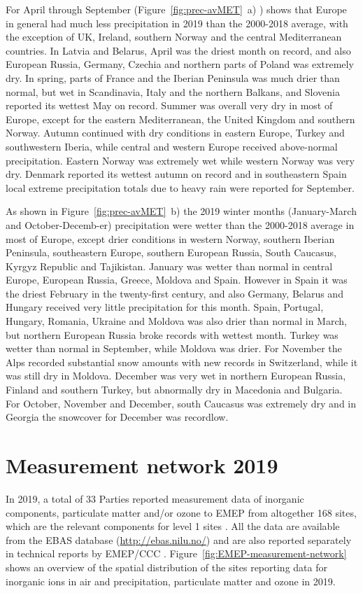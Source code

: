 For April through September (Figure~\ref{fig:prec-avMET}~a) ) shows that Europe in general had much less precipitation in 2019 than the 2000-2018 average, with the exception of UK, Ireland, southern Norway and the central Mediterranean countries. In Latvia and Belarus, April was the driest month on record, and also European Russia, Germany, Czechia and northern parts of Poland was extremely dry. In spring, parts of France and the Iberian Peninsula was much drier than normal, but wet in Scandinavia, Italy and the northern Balkans, and Slovenia reported its wettest May on record. Summer was overall very dry in most of Europe, except for the eastern Mediterranean, the United Kingdom and southern Norway. Autumn continued with dry conditions in eastern Europe, Turkey and southwestern Iberia, while central and western Europe received above-normal precipitation. Eastern Norway was extremely wet while western Norway was very dry. Denmark reported its wettest autumn on record and in southeastern Spain local extreme precipitation totals due to heavy rain were reported for September.

As shown in Figure~\ref{fig:prec-avMET}~b) the 2019 winter months (January-March and October-Decemb-er) precipitation were wetter than the 2000-2018 average in most of Europe, except drier conditions in western Norway, southern Iberian Peninsula, southeastern Europe, southern European Russia, South Caucasus, Kyrgyz Republic
and Tajikistan. January was wetter than normal in central Europe, European Russia, Greece, Moldova and Spain. However in Spain it was the driest February in the twenty-first century, and also Germany, Belarus and Hungary received very little precipitation for this month. Spain, Portugal, Hungary, Romania, Ukraine and Moldova was also drier than normal in March, but northern European Russia broke records with wettest month. Turkey was wetter than normal in September, while Moldova was drier. For November the Alps recorded substantial snow amounts with new records in Switzerland, while it was still dry in Moldova. December was very wet in northern European Russia, Finland and southern Turkey, but abnormally dry in Macedonia and Bulgaria. For October, November and December, south Caucasus was extremely dry and in Georgia the snowcover for December was recordlow.
\section{Measurement network 2019} 
\label{Obs_2019}

In 2019, a total of 33 Parties reported measurement data of inorganic components, particulate matter and/or ozone to EMEP from altogether 168 sites, which are the relevant components for level 1 sites \citep{MonStrat2019}. 
All the data are available from the EBAS database (\url{http://ebas.nilu.no/}) and are also reported separately in technical reports by EMEP/CCC \citep{Hjellbrekke2021a,Hjellbrekke2021b}. Figure~\ref{fig:EMEP-measurement-network} shows an overview of the spatial distribution of the sites reporting data for inorganic ions in air and precipitation, particulate matter and ozone in 2019.

